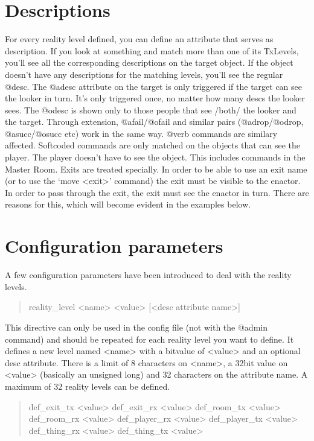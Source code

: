 \documentclass[letterpaper,10pt,english]{sphinxmanual}
\begin{document}
\section{Descriptions}
\label{\detokenize{19-reality:descriptions}}
\sphinxAtStartPar
For every reality level defined, you can define an attribute that serves as
description. If you look at something and match more than one of its
TxLevels, you’ll see all the corresponding descriptions on the target
object. If the object doesn’t have any descriptions for the matching levels,
you’ll see the regular @desc.
The @adesc attribute on the target is only triggered if the target can see
the looker in turn. It’s only triggered once, no matter how many descs the
looker sees. The @odesc is shown only to those people that see /both/ the
looker and the target.
Through extension, @afail/@ofail and similar pairs (@adrop/@odrop,
@asucc/@osucc etc) work in the same way. @verb commands are similary
affected.
Softcoded commands are only matched on the objects that can see the player.
The player doesn’t have to see the object. This includes commands in the
Master Room.
Exits are treated specially. In order to be able to use an exit name (or to
use the ‘move \textless{}exit\textgreater{}’ command) the exit must be visible to the enactor. In
order to pass through the exit, the exit must see the enactor in turn. There
are reasons for this, which will become evident in the examples below.


\section{Configuration parameters}
\label{\detokenize{19-reality:configuration-parameters}}
\sphinxAtStartPar
A few configuration parameters have been introduced to deal with the reality
levels.
\begin{quote}

\sphinxAtStartPar
reality\_level \textless{}name\textgreater{} \textless{}value\textgreater{} {[}\textless{}desc attribute name\textgreater{}{]}
\end{quote}

\sphinxAtStartPar
This directive can only be used in the config file (not with the @admin
command) and should be repeated for each reality level you want to define.
It defines a new level named \textless{}name\textgreater{} with a bitvalue of \textless{}value\textgreater{} and an
optional desc attribute. There is a limit of 8 characters on \textless{}name\textgreater{}, a
32\sphinxhyphen{}bit value on \textless{}value\textgreater{} (basically an unsigned long) and 32 characters on
the attribute name. A maximum of 32 reality levels can be defined.
\begin{quote}

\sphinxAtStartPar
def\_exit\_tx \textless{}value\textgreater{}
def\_exit\_rx \textless{}value\textgreater{}
def\_room\_tx \textless{}value\textgreater{}
def\_room\_rx \textless{}value\textgreater{}
def\_player\_rx \textless{}value\textgreater{}
def\_player\_tx \textless{}value\textgreater{}
def\_thing\_rx \textless{}value\textgreater{}
def\_thing\_tx \textless{}value\textgreater{}
\end{quote}
\end{document}
